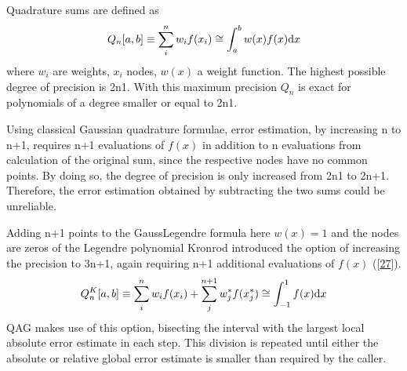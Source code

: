 \documentclass[letterpaper,10pt,english]{sphinxmanual}
\begin{document}
\sphinxAtStartPar
Quadrature sums are defined as
\begin{equation*}
\begin{split}Q_n[a,b] \equiv \sum_i^nw_if(x_i) \cong \int_a^bw(x)f(x)\textup{d}x\end{split}
\end{equation*}
\sphinxAtStartPar
where \(w_i\) are weights, \(x_i\) nodes, \(w(x)\) a weight function.
The highest possible degree of precision is 2n\sphinxhyphen{}1. With this maximum precision \(Q_n\) is exact for polynomials of a degree smaller or equal to 2n\sphinxhyphen{}1.

\sphinxAtStartPar
Using classical Gaussian quadrature formulae, error estimation, by increasing n to n+1, requires n+1 evaluations of \(f(x)\) in addition to n evaluations from
calculation of the original sum, since the respective nodes have no common points. By doing so, the degree of precision is only increased from 2n\sphinxhyphen{}1 to 2n+1.
Therefore, the error estimation obtained by subtracting the two sums could be unreliable.

\sphinxAtStartPar
Adding n+1 points to the Gauss\sphinxhyphen{}Legendre formula \sphinxhyphen{} here \(w(x)=1\) and the nodes are zeros of the Legendre polynomial \sphinxhyphen{}
Kronrod introduced the option of increasing the precision to 3n+1, again requiring n+1 additional evaluations of \(f(x)\) ({[}\hyperlink{cite.NBodySimulation/Appendix:id26}{27}{]}).
\begin{equation*}
\begin{split}Q_n^K[a,b] \equiv \sum_i^nw_if(x_i) + \sum_j^{n+1}w_j^*f(x_j^*) \cong \int_{-1}^1f(x)\textup{d}x\end{split}
\end{equation*}
\sphinxAtStartPar
QAG makes use of this option, bisecting the interval with the largest local absolute error estimate in each step.
This division is repeated until either the absolute or relative global error estimate is smaller than required by the caller.
\end{document}
